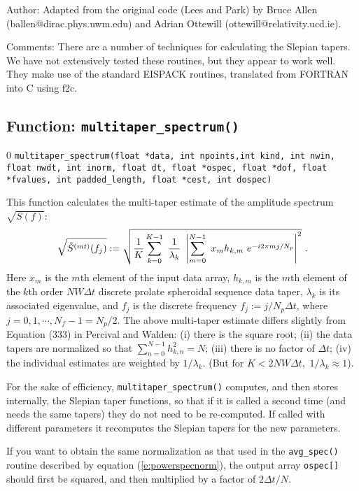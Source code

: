 \begin{description}
\item{Author:}
Adapted from the original code (Lees and Park) by Bruce Allen (ballen@dirac.phys.uwm.edu)
and Adrian Ottewill (ottewill@relativity.ucd.ie).
\item{Comments:}
There are a number of techniques for calculating the Slepian tapers.
We have not extensively tested these routines, but they appear to work
well.  They make use of the standard EISPACK routines, translated from
FORTRAN into C using f2c. 
\end{description}
\clearpage

\subsection{Function: {\tt multitaper\_spectrum()} }
\setcounter{equation}0
{\tt multitaper\_spectrum(float *data, int npoints,int kind, int nwin, float
nwdt, int inorm, float dt, float *ospec, float *dof, float *fvalues,
int padded\_length, float *cest, int dospec)}

This function calculates the multi-taper estimate of the 
amplitude spectrum $\sqrt{S(f)}$:
%
\begin{equation}
\sqrt{\hat S^{(mt)}(f_j)}:=
\sqrt{{1\over K}\sum_{k=0}^{K-1}\ 
{1\over \lambda_k}\ \left|\sum_{m=0}^{N-1}\ 
x_m h_{k,m}\ e^{-i2\pi mj/N_p}\right|^2}\ .
\end{equation}
%
Here $x_m$ is the $m$th element of the input data array,
$h_{k,m}$ is the $m$th element of the 
$k$th order $NW\Delta t$ discrete prolate spheroidal sequence data taper, 
$\lambda_k$ is its associated eigenvalue, and 
$f_j$ is the discrete frequency $f_j:=j/N_p\Delta t$, 
where $j=0,1,\cdots,N_f-1=N_p/2$.
The above multi-taper estimate differs slightly from Equation (333) 
in Percival and Walden:
(i) there is the square root;
(ii) the data tapers are normalized so that 
$\sum_{n=0}^{N-1} h_{k,n}^2=N$;
(iii) there is no factor of $\Delta t$;
(iv) the individual estimates are weighted by $1/\lambda_k$.
(But for $K<2NW\Delta t$,\ $1/\lambda_k\approx 1$).

For the sake of efficiency, {\tt multitaper\_spectrum()} computes, and
then stores internally, the Slepian taper functions, so
that if it is called a second time (and needs the same tapers) they do not
need to be re-computed.  If called with different parameters it recomputes
the Slepian tapers for the new parameters.

If you want to obtain the same normalization as that used in the 
{\tt avg\_spec()} routine described by equation (\ref{e:powerspecnorm}), 
the output array {\tt ospec[]} should first be squared, and then 
multiplied by a factor of $2\Delta t/N$.

